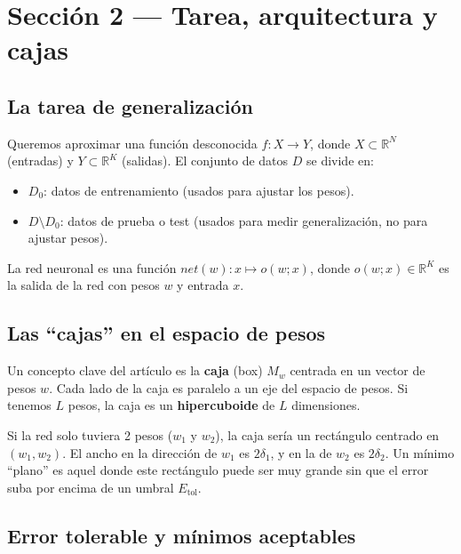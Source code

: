 \documentclass[11pt,a4paper]{article}
\newcounter{ejemplo}
\newenvironment{ejemplo}[1][]{%
  \refstepcounter{ejemplo}%
  \begin{tcolorbox}[colback=grisclaro,colframe=naranja,title=Ejemplo intuitivo \theejemplo: #1,breakable]}%
  {\end{tcolorbox}}
\begin{document}
\section{Sección 2 — Tarea, arquitectura y cajas}
\label{sec:sec2}

\subsection{La tarea de generalización}

Queremos aproximar una función desconocida $f: X \to Y$, donde $X \subset \mathbb{R}^N$ (entradas) y $Y \subset \mathbb{R}^K$ (salidas). El conjunto de datos $D$ se divide en:

\begin{itemize}
    \item $D_0$: datos de entrenamiento (usados para ajustar los pesos).
    \item $D \setminus D_0$: datos de prueba o test (usados para medir generalización, no para ajustar pesos).
\end{itemize}

La red neuronal es una función $net(w): x \mapsto o(w; x)$, donde $o(w; x) \in \mathbb{R}^K$ es la salida de la red con pesos $w$ y entrada $x$.

\subsection{Las ``cajas'' en el espacio de pesos}

Un concepto clave del artículo es la \textbf{caja} (box) $M_w$ centrada en un vector de pesos $w$. Cada lado de la caja es paralelo a un eje del espacio de pesos. Si tenemos $L$ pesos, la caja es un \textbf{hipercuboide} de $L$ dimensiones.

\begin{ejemplo}[Visualización de una caja en 2 dimensiones]
Si la red solo tuviera 2 pesos ($w_1$ y $w_2$), la caja sería un rectángulo centrado en $(w_1, w_2)$. El ancho en la dirección de $w_1$ es $2\delta_1$, y en la de $w_2$ es $2\delta_2$. Un mínimo ``plano'' es aquel donde este rectángulo puede ser muy grande sin que el error suba por encima de un umbral $E_{\text{tol}}$.
\end{ejemplo}

\subsection{Error tolerable y mínimos aceptables}
\end{document}
